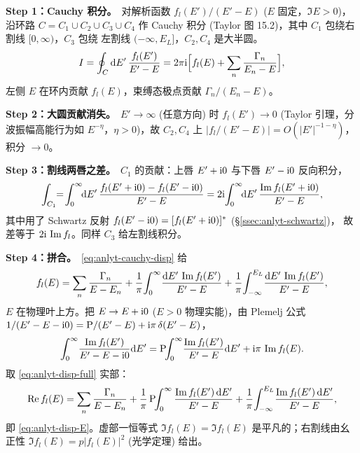 \begin{proof*}
\textbf{Step 1：Cauchy 积分。}\,
对解析函数 $f_l(E')/(E'-E)$ ($E$ 固定，$\Im E>0$)，沿环路 $C=C_1\cup C_2\cup C_3\cup C_4$
作 Cauchy 积分 (Taylor 图 15.2)，其中 $C_1$ 包绕右割线 $[0,\infty)$，$C_3$ 包绕
左割线 $(-\infty,E_L]$，$C_2,C_4$ 是大半圆。
\begin{equation}
I=\oint_C\mathrm{d} E'\,\frac{f_l(E')}{E'-E}=2\pi\mathrm{i}\Bigl[f_l(E)+\sum_n\frac{\Gamma_n}{E_n-E}\Bigr],
\label{eq:anlyt-cauchy-disp}
\end{equation}
左侧 $E$ 在环内贡献 $f_l(E)$，束缚态极点贡献 $\Gamma_n/(E_n-E)$。

\textbf{Step 2：大圆贡献消失。}\,
$E'\to\infty$ (任意方向) 时 $f_l(E')\to 0$ (Taylor 引理，分波振幅高能行为如
$E^{-\eta}$，$\eta>0$)，故 $C_2,C_4$ 上 $|f_l/(E'-E)|=O(|E'|^{-1-\eta})$，
积分 $\to 0$。

\textbf{Step 3：割线两唇之差。}\,
$C_1$ 的贡献：上唇 $E'+\mathrm{i} 0$ 与下唇 $E'-\mathrm{i} 0$ 反向积分，
\begin{equation}
\int_{C_1}\!\!=\!\int_0^\infty\!\!\rmd E'\,\frac{f_l(E'+\rmi 0)-f_l(E'-\rmi 0)}{E'-E}
=2\rmi\!\int_0^\infty\!\!\rmd E'\,\frac{\Im f_l(E'+\rmi 0)}{E'-E},
\label{eq:anlyt-C1}
\end{equation}
其中用了 Schwartz 反射 $f_l(E'-\mathrm{i} 0)=[f_l(E'+\mathrm{i} 0)]^*$ (\S\ref{ssec:anlyt-schwartz})，
故差等于 $2\mathrm{i}\,\Im f_l$。同样 $C_3$ 给左割线积分。

\textbf{Step 4：拼合。}\,
\eqref{eq:anlyt-cauchy-disp} 给
\begin{equation}
f_l(E) = \sum_n\frac{\Gamma_n}{E-E_n}+\frac{1}{\pi}\!\int_0^\infty\!\frac{\mathrm{d} E'\,\Im f_l(E')}{E'-E}
+\frac{1}{\pi}\!\int_{-\infty}^{E_L}\!\frac{\mathrm{d} E'\,\Im f_l(E')}{E'-E},
\label{eq:anlyt-disp-full}
\end{equation}
$E$ 在物理叶上方。把 $E\to E+\mathrm{i} 0$ ($E>0$ 物理实能)，由 Plemelj 公式
$1/(E'-E-\mathrm{i} 0)=\mathrm P/(E'-E)+\mathrm{i}\pi\,\delta(E'-E)$，
\begin{equation}
\int_0^\infty\!\frac{\Im f_l(E')}{E'-E-\mathrm{i} 0}\mathrm{d} E'
=\mathrm P\!\!\int_0^\infty\!\frac{\Im f_l(E')}{E'-E}\mathrm{d} E'+\mathrm{i}\pi\,\Im f_l(E).
\label{eq:anlyt-plemelj}
\end{equation}
取 \eqref{eq:anlyt-disp-full} 实部：
\begin{equation}
\Re f_l(E)=\sum_n\frac{\Gamma_n}{E-E_n}
+\frac{1}{\pi}\,\mathrm P\!\!\int_0^\infty\frac{\Im f_l(E')\,\mathrm{d} E'}{E'-E}
+\frac{1}{\pi}\!\int_{-\infty}^{E_L}\!\frac{\Im f_l(E')\,\mathrm{d} E'}{E'-E},
\label{eq:anlyt-Refl-final}
\end{equation}
即 \eqref{eq:anlyt-disp-E}。虚部一恒等式
$\Im f_l(E)=\Im f_l(E)$ 是平凡的；右割线由幺正性
$\Im f_l(E)=p|f_l(E)|^2$ (光学定理) 给出。
\end{proof*}

